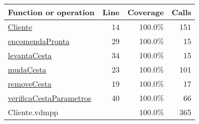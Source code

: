 \bigskip
\begin{longtable}{|l|r|r|r|}
\hline
Function or operation & Line & Coverage & Calls \\
\hline
\hline
\hyperref[Cliente:14]{Cliente} & 14&100.0\% & 151 \\
\hline
\hyperref[encomendaPronta:29]{encomendaPronta} & 29&100.0\% & 15 \\
\hline
\hyperref[levantaCesta:34]{levantaCesta} & 34&100.0\% & 15 \\
\hline
\hyperref[mudaCesta:23]{mudaCesta} & 23&100.0\% & 101 \\
\hline
\hyperref[removeCesta:19]{removeCesta} & 19&100.0\% & 17 \\
\hline
\hyperref[verificaCestaParametros:40]{verificaCestaParametros} & 40&100.0\% & 66 \\
\hline
\hline
Cliente.vdmpp & & 100.0\% & 365 \\
\hline
\end{longtable}

